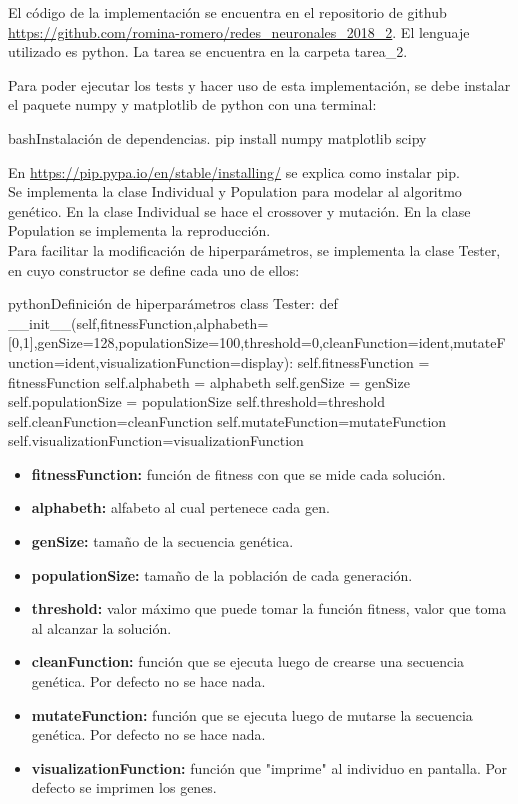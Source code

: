 \documentclass[letterpaper,11pt]{article} %
\begin{document}
El código de la implementación se encuentra en el repositorio de github \url{https://github.com/romina-romero/redes_neuronales_2018_2}. El lenguaje utilizado es python. La tarea se encuentra en la carpeta tarea\_2.

Para poder ejecutar los tests y hacer uso de esta implementación, se debe instalar el paquete numpy y matplotlib de python con una terminal:

\begin{sourcecode}[\label{instalacion}]{bash}{Instalación de dependencias.}
pip install numpy matplotlib scipy
\end{sourcecode}

En \url{https://pip.pypa.io/en/stable/installing/} se explica como instalar pip.\\

Se implementa la clase Individual y Population para modelar al algoritmo genético. En la clase Individual se hace el crossover y mutación. En la clase Population se implementa la reproducción.\\

Para facilitar la modificación de hiperparámetros, se implementa la clase Tester, en cuyo constructor se define cada uno de ellos:\\

\begin{sourcecode}[\label{hiperparametros}]{python}{Definición de hiperparámetros}
class Tester:
    def __init__(self,fitnessFunction,alphabeth=[0,1],genSize=128,populationSize=100,threshold=0,cleanFunction=ident,mutateFunction=ident,visualizationFunction=display):
        self.fitnessFunction = fitnessFunction
        self.alphabeth = alphabeth
        self.genSize = genSize
        self.populationSize = populationSize
        self.threshold=threshold
        self.cleanFunction=cleanFunction
        self.mutateFunction=mutateFunction
        self.visualizationFunction=visualizationFunction
\end{sourcecode}

\begin{itemize}
\item \textbf{fitnessFunction:} función de fitness con que se mide cada solución.
\item \textbf{alphabeth:} alfabeto al cual pertenece cada gen.
\item \textbf{genSize:} tamaño de la secuencia genética.
\item \textbf{populationSize:} tamaño de la población de cada generación.
\item \textbf{threshold:} valor máximo que puede tomar la función fitness, valor que toma al alcanzar la solución.
\item \textbf{cleanFunction:} función que se ejecuta luego de crearse una secuencia genética. Por defecto no se hace nada.
\item \textbf{mutateFunction:} función que se ejecuta luego de mutarse la secuencia genética. Por defecto no se hace nada.
\item \textbf{visualizationFunction:} función que "imprime" al individuo en pantalla. Por defecto se imprimen los genes.
\end{itemize}
\end{document}
